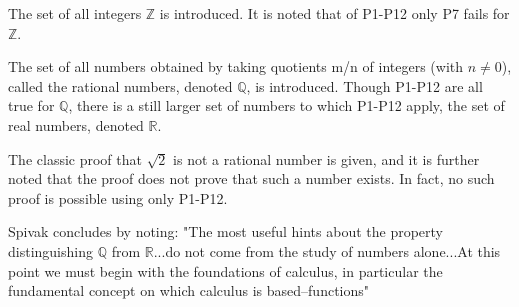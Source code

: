 \documentclass{article}
\begin{document}
\begin{flushleft}
The set of all integers $\mathbb{Z}$ is introduced. It is noted that of P1-P12 only P7 fails for $\mathbb{Z}$.
\end{flushleft}

\begin{flushleft}
The set of all numbers obtained by taking quotients m/n of integers (with $n\neq0$), called the rational numbers, denoted $\mathbb{Q}$, is introduced. Though P1-P12 are all true for $\mathbb{Q}$, there is a still larger set of numbers to which P1-P12 apply, the set of real numbers, denoted $\mathbb{R}$.
\end{flushleft}

\begin{flushleft}
The classic proof that $\sqrt{2}$ is not a rational number is given, and it is further noted that the proof does not prove that such a number exists. In fact, no such proof is possible using only P1-P12.
\end{flushleft}

\begin{flushleft}
Spivak concludes by noting: "The most useful hints about the property distinguishing $\mathbb{Q}$ from $\mathbb{R}$...do not come from the study of numbers alone...At this point we must begin with the foundations of calculus, in particular the fundamental concept on which calculus is based--functions"
\end{flushleft}
\end{document}
